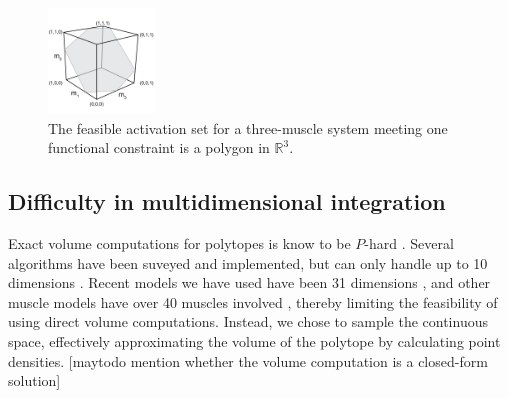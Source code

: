 \begin{figure}[ht]
  \label{fig:fig_hr}
   \begin{center}
    \includegraphics[width=0.25\textwidth]{sections/figs/feasibleactivation.png}
  \end{center}
  \caption{The feasible activation set for a  three-muscle system meeting one functional constraint is a polygon in $\mathbb{R}^3$.} %
\end{figure}

\subsection{Difficulty in multidimensional integration}
Exact volume computations for polytopes is know to be $P$-hard \cite{Dyer}. Several algorithms have been suveyed and implemented, but can only handle up to 10 dimensions \cite{Bueler2}.  
Recent models we have used have been 31 dimensions \cite{Valero-Cuevas2015high-dimensional}, and other muscle models have over 40 muscles involved \cite{arnold2010model, kutch2012challenges, hamner2010muscle, de2014human}, thereby limiting the feasibility of using direct volume computations. Instead, we chose to sample the continuous space, effectively approximating the volume of the polytope by calculating point densities. [maytodo mention whether the volume computation is a closed-form solution]

